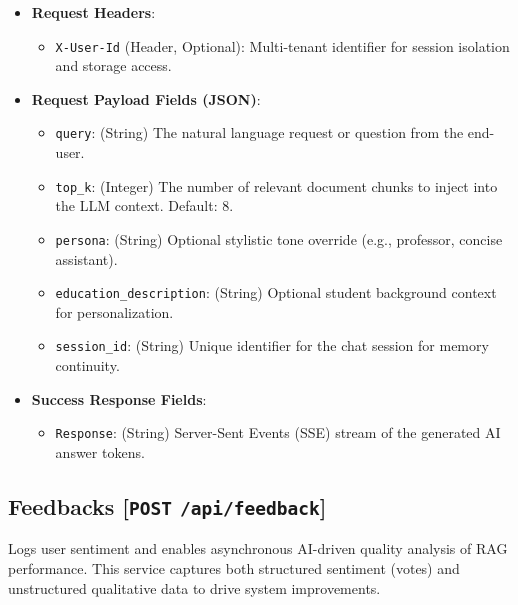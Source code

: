 \begin{itemize}
    \item \textbf{Request Headers}:
    \begin{itemize}
        \item \texttt{X-User-Id} (Header, Optional): Multi-tenant identifier for session isolation and storage access.
    \end{itemize}
    \item \textbf{Request Payload Fields (JSON)}:
    \begin{itemize}
        \item \texttt{query}: (String) The natural language request or question from the end-user.
        \item \texttt{top\_k}: (Integer) The number of relevant document chunks to inject into the LLM context. Default: 8.
        \item \texttt{persona}: (String) Optional stylistic tone override (e.g., professor, concise assistant).
        \item \texttt{education\_description}: (String) Optional student background context for personalization.
        \item \texttt{session\_id}: (String) Unique identifier for the chat session for memory continuity.
    \end{itemize}
    \item \textbf{Success Response Fields}:
    \begin{itemize}
        \item \texttt{Response}: (String) Server-Sent Events (SSE) stream of the generated AI answer tokens.
    \end{itemize}
\end{itemize}

\subsection{Feedbacks [\texttt{POST} \texttt{/api/feedback}]}
Logs user sentiment and enables asynchronous AI-driven quality analysis of RAG performance. This service captures both structured sentiment (votes) and unstructured qualitative data to drive system improvements.

